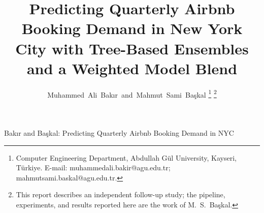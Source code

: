 \documentclass[journal]{IEEEtran}
\begin{document}
\title{Predicting Quarterly Airbnb Booking Demand in New York City with
Tree-Based Ensembles and a Weighted Model Blend}

\author{Muhammed~Ali~Bak{\i}r~and~Mahmut~Sami~Ba\c{s}kal%
\thanks{Computer Engineering Department, Abdullah G\"ul University,
Kayseri, T\"urkiye.
E-mail: muhammedali.bakir@agu.edu.tr; mahmutsami.baskal@agu.edu.tr.}%
\thanks{This report describes an independent follow-up study; the pipeline,
experiments, and results reported here are the work of M.\ S.\ Ba\c{s}kal.}}

%
{Bak{\i}r and Ba\c{s}kal: Predicting Quarterly Airbnb Booking Demand in NYC}

\maketitle
\end{document}
